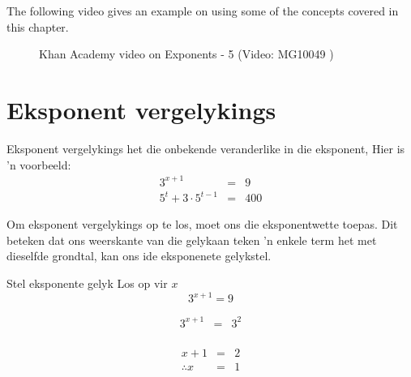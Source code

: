 The following video gives an example on using some of the concepts covered in this chapter.
\setcounter{subfigure}{0}
\begin{figure}[H] %
\textnormal{Khan Academy video on Exponents - 5}\vspace{.1in} \nopagebreak
\label{m38359*yt-media5}\label{m38359*yt-video5}
 { (Video:  MG10049 )}
\end{figure}    


\section{Eksponent vergelykings}

Eksponent vergelykings het die onbekende veranderlike in die eksponent, Hier is 'n voorbeeld:
\begin{eqnarray*}
 3^{x+1} & = & 9 \\
5^t + 3 \cdot 5^{t-1} & = & 400
\end{eqnarray*}

Om eksponent vergelykings op te los, moet ons die eksponentwette toepas. Dit beteken dat ons weerskante van die gelykaan teken 'n enkele term het met dieselfde grondtal, kan ons ide eksponenete gelykstel.




\begin{wex}
{%
Stel eksponente gelyk
}
{%
Los op vir $x$
$$ 3^{x+1} = 9 $$
}
{%

\begin{eqnarray*}
 3^{x+1} & = & 3^2 \\
\end{eqnarray*}

\begin{eqnarray*}
 {x+1} & = & 2 \\
\therefore x & = & 1
\end{eqnarray*}
}
\end{wex}

